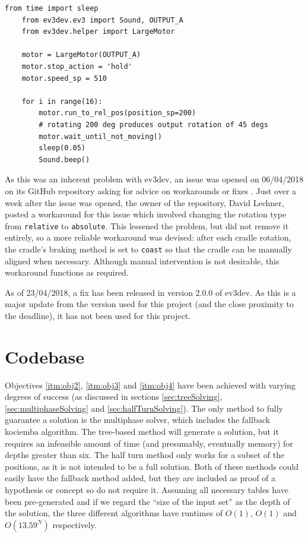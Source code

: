 \documentclass{report}
\newenvironment{aside}
{\begin{mdframed}[style=0,%
		leftline=false,rightline=false,leftmargin=2em,rightmargin=2em,%
		innerleftmargin=0pt,innerrightmargin=0pt,linewidth=0.75pt,%
		skipabove=7pt,skipbelow=7pt]\small}
	{\end{mdframed}}
\begin{document}
    \begin{lstlisting}[caption={A short script to test the cradle's accuracy}, label={lst:cradleAccuracyTest}]
    from time import sleep
    from ev3dev.ev3 import Sound, OUTPUT_A
    from ev3dev.helper import LargeMotor
    
    motor = LargeMotor(OUTPUT_A)
    motor.stop_action = 'hold'
    motor.speed_sp = 510
    
    for i in range(16):
	    motor.run_to_rel_pos(position_sp=200)
	    # rotating 200 deg produces output rotation of 45 degs
	    motor.wait_until_not_moving()
	    sleep(0.05)
	    Sound.beep()\end{lstlisting}
    
    As this was an inherent problem with ev3dev, an issue was opened on 06/04/2018 on its GitHub repository asking for advice on workarounds or fixes \cite{Worgarside2018}. Just over a week after the issue was opened, the owner of the repository, David Lechner, posted a workaround for this issue which involved changing the rotation type from \lstinline|relative| to \lstinline|absolute|. This lessened the problem, but did not remove it entirely, so a more reliable workaround was devised: after each cradle rotation, the cradle's braking method is set to \lstinline|coast| so that the cradle can be manually aligned when necessary. Although manual intervention is not desirable, this workaround functions as required.
    
    \begin{aside}
    	As of 23/04/2018, a fix has been released in version 2.0.0 of ev3dev. As this is a major update from the version used for this project (and the close proximity to the deadline), it has not been used for this project.
    \end{aside}
    
    \section{Codebase}
    
    Objectives \ref{itm:obj2}, \ref{itm:obj3} and \ref{itm:obj4} have been achieved with varying degrees of success (as discussed in sections \ref{sec:treeSolving}, \ref{sec:multiphaseSolving} and \ref{sec:halfTurnSolving}). The only method to fully guarantee a solution is the multiphase solver, which includes the fallback kociemba algorithm. The tree-based method will generate a solution, but it requires an infeasible amount of time (and presumably, eventually memory) for depths greater than six. The half turn method only works for a subset of the positions, as it is not intended to be a full solution. Both of these methods could easily have the fallback method added, but they are included as proof of a hypothesis or concept so do not require it. Assuming all necessary tables have been pre-generated and if we regard the \enquote{size of the input set} as the depth of the solution, the three different algorithms have runtimes of $O(1)$, $O(1)$ and $O(13.59^N)$ respectively.
    
\end{document}
